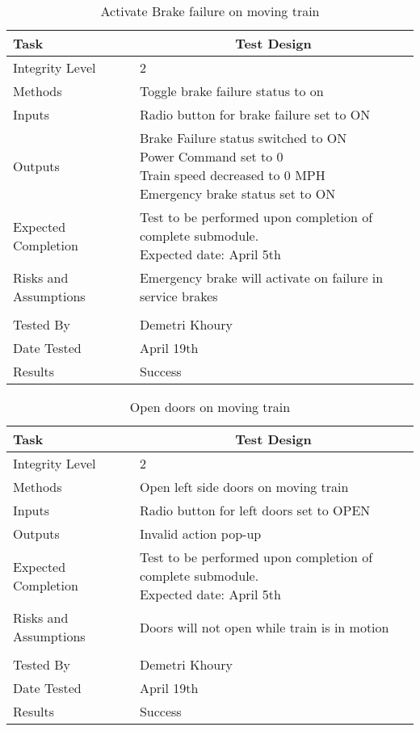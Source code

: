\documentclass[]{article}
\begin{document}
	\begin{table}[H]
		\centering
		\caption{Activate Brake failure on moving train}
		\begin{tabular}{|l|l|}
			\hline
			Task & \multicolumn{1}{c|}{Test Design} \\ \hline
			Integrity Level & 2 \\ \hline
			Methods & Toggle brake failure status to on  \\ \hline
			Inputs &  Radio button for brake failure set to ON \\ \hline
			Outputs & \parbox[t]{10cm}{ Brake Failure status switched to ON\\ Power Command set to 0\\ Train speed decreased to 0 MPH\\ Emergency brake status set to ON  }\\ \hline
			Expected Completion & \parbox[t]{10cm}{Test to be performed upon completion of complete submodule.\\ Expected date: April 5th}\\ \hline
			Risks and Assumptions & Emergency brake will activate on failure in service brakes\\ \hline
			\\ \hline
			Tested By   &  Demetri Khoury\\	\hline
			Date Tested & \parbox[t]{10cm}{April 19th}\\ \hline
			Results & Success\\ \hline
		\end{tabular}
	\end{table}

	\begin{table}[H]
		\centering
		\caption{Open doors on moving train}
		\begin{tabular}{|l|l|}
			\hline
			Task & \multicolumn{1}{c|}{Test Design} \\ \hline
			Integrity Level & 2 \\ \hline
			Methods & Open left side doors on moving train  \\ \hline
			Inputs &  Radio button for left doors set to OPEN \\ \hline
			Outputs & Invalid action pop-up\\ \hline
			Expected Completion & \parbox[t]{10cm}{Test to be performed upon completion of complete submodule.\\ Expected date: April 5th}\\ \hline
			Risks and Assumptions & Doors will not open while train is in motion\\ \hline
			\\ \hline
			Tested By   &  Demetri Khoury\\	\hline
			Date Tested & \parbox[t]{10cm}{April 19th}\\ \hline
			Results & Success\\ \hline
		\end{tabular}
	\end{table}
\end{document}
